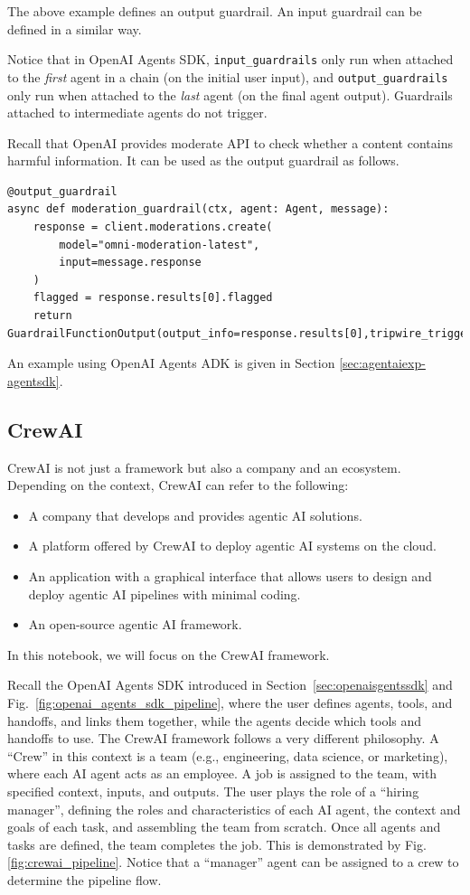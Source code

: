 The above example defines an output guardrail. An input guardrail can be defined in a similar way.

Notice that in OpenAI Agents SDK, \verb|input_guardrails| only run when attached to the \emph{first} agent in a chain (on the initial user input), and \verb|output_guardrails| only run when attached to the \emph{last} agent (on the final agent output). Guardrails attached to intermediate agents do not trigger.

Recall that OpenAI provides moderate API to check whether a content contains harmful information. It can be used as the output guardrail as follows.
\begin{lstlisting}
@output_guardrail
async def moderation_guardrail(ctx, agent: Agent, message):
	response = client.moderations.create(
		model="omni-moderation-latest",
		input=message.response
	)
	flagged = response.results[0].flagged
	return GuardrailFunctionOutput(output_info=response.results[0],tripwire_triggered=flagged)
\end{lstlisting}

An example using OpenAI Agents ADK is given in Section \ref{sec:agentaiexp-agentsdk}.

\subsection{CrewAI}

CrewAI is not just a framework but also a company and an ecosystem. Depending on the context, CrewAI can refer to the following:
\begin{itemize}
	\item A company that develops and provides agentic AI solutions.
	\item A platform offered by CrewAI to deploy agentic AI systems on the cloud.
	\item An application with a graphical interface that allows users to design and deploy agentic AI pipelines with minimal coding.
	\item An open-source agentic AI framework.
\end{itemize}
In this notebook, we will focus on the CrewAI framework.

Recall the OpenAI Agents SDK introduced in Section~\ref{sec:openaisgentssdk} and Fig.~\ref{fig:openai_agents_sdk_pipeline}, where the user defines agents, tools, and handoffs, and links them together, while the agents decide which tools and handoffs to use. The CrewAI framework follows a very different philosophy. A ``Crew'' in this context is a team (e.g., engineering, data science, or marketing), where each AI agent acts as an employee. A job is assigned to the team, with specified context, inputs, and outputs. The user plays the role of a ``hiring manager'', defining the roles and characteristics of each AI agent, the context and goals of each task, and assembling the team from scratch. Once all agents and tasks are defined, the team completes the job. This is demonstrated by Fig. \ref{fig:crewai_pipeline}. Notice that a ``manager'' agent can be assigned to a crew to determine the pipeline flow.

